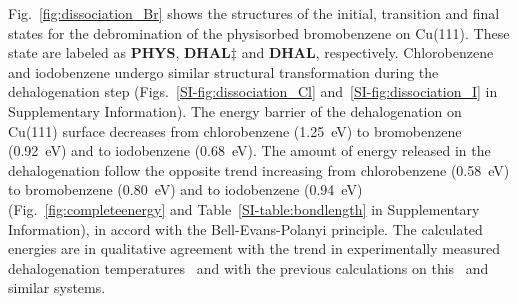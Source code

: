 \documentclass[%
 reprint,
 amsmath,amssymb,
 aps,
prb,
floatfix,
]{revtex4-2}
\newcommand{\lock}{\color{red}}
\newcommand{\lock}{\color{red}}
\newcommand{\comm}{\color{Purple}} %
\newcommand{\sinfo}{Supplementary Information}
\begin{document}
{\lock

Fig.~\ref{fig:dissociation_Br} shows the structures of the initial, transition and final states for the debromination of the physisorbed bromobenzene on Cu(111). These state are labeled as \textbf{PHYS}, \textbf{DHAL$\ddagger$} and \textbf{DHAL}, respectively. Chlorobenzene and iodobenzene undergo similar structural transformation during the dehalogenation step (Figs.~\ref{SI-fig:dissociation_Cl} and~\ref{SI-fig:dissociation_I} in \sinfo).
%
%
The energy barrier of the dehalogenation on Cu(111) surface decreases from chlorobenzene (\SI{1.25}{\electronvolt}) to bromobenzene (\SI{0.92}{\electronvolt}) and to iodobenzene (\SI{0.68}{\electronvolt}). 
The amount of energy released in the dehalogenation follow the opposite trend increasing from chlorobenzene (\SI{0.58}{\electronvolt}) to bromobenzene (\SI{0.80}{\electronvolt}) and to iodobenzene (\SI{0.94}{\electronvolt}) (Fig.~\ref{fig:completeenergy} and Table~\ref{SI-table:bondlength} in \sinfo), in accord with the Bell-Evans-Polanyi principle.
%
The calculated energies are in qualitative agreement with the trend in experimentally measured dehalogenation temperatures~\cite{ullmann_52,ullmann_87,ullmann_67} and with the previous calculations on this~\cite{jacs2013} and similar systems.


}
\end{document}
